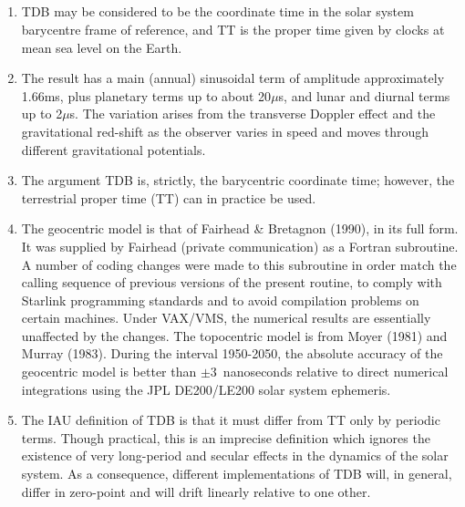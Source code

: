 {
  \\
  \\
  \\
  \\
}
{
}
\notes
{
 \begin{enumerate}
  \item TDB may be considered to
        be the coordinate time in the solar system barycentre frame of
        reference, and TT is the proper time given by clocks at mean sea
        level on the Earth.
  \item The result has a main (annual) sinusoidal term of amplitude
        approximately 1.66ms, plus planetary terms up to about
        20$\mu$s, and lunar and diurnal terms up to 2$\mu$s.  The
        variation arises from the transverse Doppler effect and the
        gravitational red-shift as the observer varies in speed and
        moves through different gravitational potentials.
  \item The argument TDB is, strictly, the barycentric coordinate time;
        however, the terrestrial proper time (TT) can in practice be used.
  \item The geocentric model is that of Fairhead \& Bretagnon (1990),
        in its full
        form.  It was supplied by Fairhead (private communication)
        as a Fortran subroutine.  A number of coding changes were made to
        this subroutine in order
        match the calling sequence of previous versions of the present
        routine, to comply with Starlink programming standards and to
        avoid compilation problems on certain machines.  Under
        VAX/VMS, the numerical results are essentially unaffected by the
        changes.  The topocentric model is from Moyer (1981) and Murray (1983).
        During the interval 1950-2050, the absolute accuracy of the
        geocentric model is better than $\pm3$~nanoseconds
        relative to direct numerical integrations using the JPL DE200/LE200
        solar system ephemeris.
  \item The IAU definition of TDB is that it must differ from TT only by
        periodic terms.  Though practical, this is an imprecise definition
        which ignores the existence of very long-period and secular effects
        in the dynamics of the solar system.  As a consequence, different
        implementations of TDB will, in general, differ in zero-point and
        will drift linearly relative to one other.
 \end{enumerate}
}
